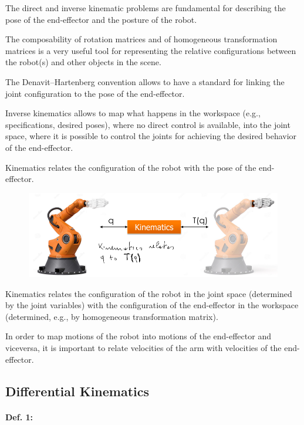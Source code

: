 \hfill

The direct and inverse kinematic problems are fundamental for describing the pose of the end-effector and the posture of the robot.

The composability of rotation matrices and of homogeneous transformation matrices is a very useful tool for representing the relative configurations between the robot(s) and other objects in the scene.

The Denavit–Hartenberg convention allows to have a standard for linking the joint configuration to the pose of the end-effector.

Inverse kinematics allows to map what happens in the workspace (e.g., specifications, desired poses), where no direct control is available, into the joint space, where it is possible to control the joints for achieving the desired behavior of the end-effector.

\hfill

Kinematics relates the configuration of the robot with the pose of the end-effector.

\begin{figure}[H]
    \centering
    \includegraphics[width=1\linewidth]{imgs/differential_kinematics_begin.png}
\end{figure}

Kinematics relates the configuration of the robot in the joint space (determined by the joint variables) with the configuration of the end-effector in the workspace (determined, e.g., by homogeneous transformation matrix).

In order to map motions of the robot into motions of the end-effector and viceversa, it is important to relate velocities of the arm with velocities of the end-effector.

\hfill

\subsection{Differential Kinematics}

\paragraph{Def. 1:}

